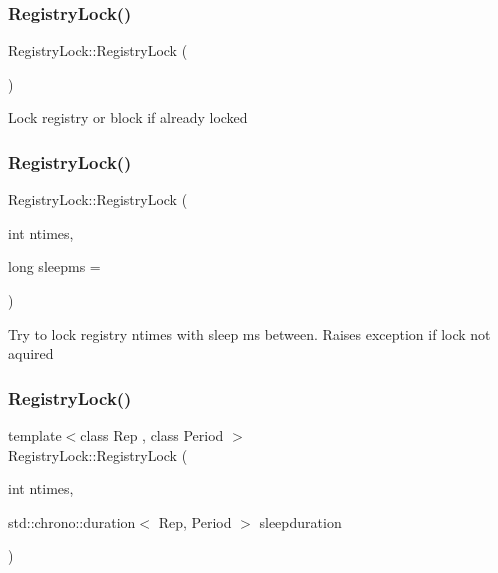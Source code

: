 \subsubsection{\texorpdfstring{Registry\+Lock()}{RegistryLock()}\hspace{0.1cm}{\footnotesize\ttfamily [1/3]}}
{\footnotesize\ttfamily Registry\+Lock\+::\+Registry\+Lock (\begin{DoxyParamCaption}{ }\end{DoxyParamCaption})}

Lock registry or block if already locked \mbox{\label{structtheoria_1_1core_1_1RegistryLock_a207ca3d063dd8aa9864a69c8bfc7d37d}} 
\subsubsection{\texorpdfstring{Registry\+Lock()}{RegistryLock()}\hspace{0.1cm}{\footnotesize\ttfamily [2/3]}}
{\footnotesize\ttfamily Registry\+Lock\+::\+Registry\+Lock (\begin{DoxyParamCaption}\item[{int}]{ntimes,  }\item[{long}]{sleepms = {} }\end{DoxyParamCaption})}

Try to lock registry ntimes with sleep ms between. Raises exception if lock not aquired \mbox{\label{structtheoria_1_1core_1_1RegistryLock_a125ee48beb0368158dc4a38716196d5c}} 
\subsubsection{\texorpdfstring{Registry\+Lock()}{RegistryLock()}\hspace{0.1cm}{\footnotesize\ttfamily [3/3]}}
{\footnotesize\ttfamily template$<$class Rep , class Period $>$ \\
Registry\+Lock\+::\+Registry\+Lock (\begin{DoxyParamCaption}\item[{int}]{ntimes,  }\item[{std\+::chrono\+::duration$<$ Rep, Period $>$}]{sleepduration }\end{DoxyParamCaption})}

